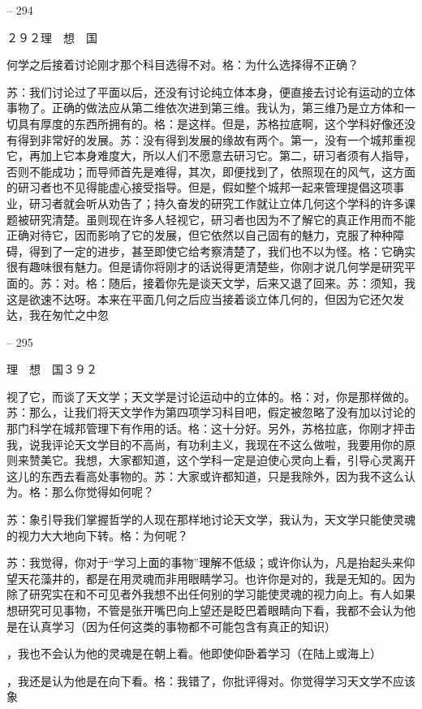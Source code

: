 \documentclass[11pt,oneside]{book}
\begin{document}
\begin{common-format}
-- 294

    ２９２理　想　国

    何学之后接着讨论刚才那个科目选得不对。格：为什么选择得不正确？

    苏：我们讨论过了平面以后，还没有讨论纯立体本身，便直接去讨论有运动的立体事物了。正确的做法应从第二维依次进到第三维。我认为，第三维乃是立方体和一切具有厚度的东西所拥有的。格：是这样。但是，苏格拉底啊，这个学科好像还没有得到非常好的发展。苏：没有得到发展的缘故有两个。第一，没有一个城邦重视它，再加上它本身难度大，所以人们不愿意去研习它。第二，研习者须有人指导，否则不能成功；而导师首先是难得，其次，即便找到了，依照现在的风气，这方面的研习者也不见得能虚心接受指导。但是，假如整个城邦一起来管理提倡这项事业，研习者就会听从劝告了；持久奋发的研究工作就让立体几何这个学科的许多课题被研究清楚。虽则现在许多人轻视它，研习者也因为不了解它的真正作用而不能正确对待它，因而影响了它的发展，但它依然以自己固有的魅力，克服了种种障碍，得到了一定的进步，甚至即使它给考察清楚了，我们也不以为怪。格：它确实很有趣味很有魅力。但是请你将刚才的话说得更清楚些，你刚才说几何学是研究平面的。苏：对。格：随后，接着你先是谈天文学，后来又退了回来。苏：须知，我这是欲速不达呀。本来在平面几何之后应当接着谈立体几何的，但因为它还欠发达，我在匆忙之中忽

    

-- 295

    理　想　国３９２

    视了它，而谈了天文学；天文学是讨论运动中的立体的。格：对，你是那样做的。苏：那么，让我们将天文学作为第四项学习科目吧，假定被忽略了没有加以讨论的那门科学在城邦管理下有作用的话。格：这十分好。另外，苏格拉底，你刚才抨击我，说我评论天文学目的不高尚，有功利主义，我现在不这么做啦，我要用你的原则来赞美它。我想，大家都知道，这个学科一定是迫使心灵向上看，引导心灵离开这儿的东西去看高处事物的。苏：大家或许都知道，只是我除外，因为我不这么认为。格：那么你觉得如何呢？

    苏：象引导我们掌握哲学的人现在那样地讨论天文学，我认为，天文学只能使灵魂的视力大大地向下转。格：为何呢？

    苏：我觉得，你对于“学习上面的事物”理解不低级；或许你认为，凡是抬起头来仰望天花藻井的，都是在用灵魂而非用眼睛学习。也许你是对的，我是无知的。因为除了研究实在和不可见者外我想不出任何别的学习能使灵魂的视力向上。有人如果想研究可见事物，不管是张开嘴巴向上望还是眨巴着眼睛向下看，我都不会认为他是在认真学习（因为任何这类的事物都不可能包含有真正的知识）

    ，我也不会认为他的灵魂是在朝上看。他即使仰卧着学习（在陆上或海上）

    ，我还是认为他是在向下看。格：我错了，你批评得对。你觉得学习天文学不应该象


\end{common-format}
\end{document}
